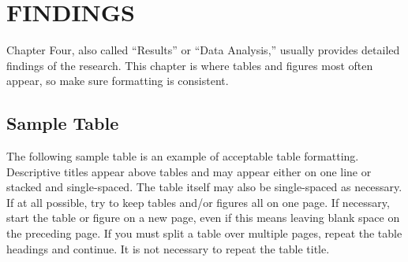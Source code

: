 \documentclass{UCF_ETD}
\begin{document}











\chapter{FINDINGS}
Chapter Four, also called ``Results'' or ``Data Analysis,'' usually provides detailed findings of the research.  This chapter is where tables and figures most often appear, so make sure formatting is consistent.

\section{Sample Table}
The following sample table is an example of acceptable table formatting. Descriptive titles appear above tables and may appear either on one line or stacked and single-spaced. The table itself may also be single-spaced as necessary. If at all possible, try to keep tables and/or figures all on one page. If necessary, start the table or figure on a new page, even if this means leaving blank space on the preceding page. If you must split a table over multiple pages, repeat the table headings and continue. It is not necessary to repeat the table title.
\end{document}
